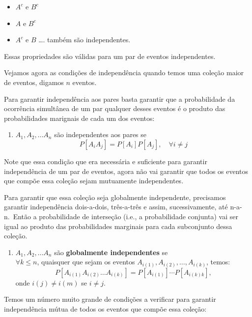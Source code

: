 \documentclass[
]{book}
\providecommand{\tightlist}{%
  \setlength{\itemsep}{0pt}\setlength{\parskip}{0pt}}
\theoremstyle{definition}
\theoremstyle{definition}
\theoremstyle{definition}
\theoremstyle{remark}
\begin{document}
\begin{itemize}
\tightlist
\item
  \({A^c}\) e \({B^c}\)\\
\item
  \({A}\) e \({B^c}\)\\
\item
  \({A^c}\) e \({B}\) \ldots. também são independentes.
\end{itemize}

Essas propriedades são válidas para um par de eventos independentes.

Vejamos agora as condições de independência quando temos uma coleção maior de eventos, digamos \(n\) eventos.

Para garantir independência aos pares basta garantir que a probabilidade da ocorrência simultânea de um par qualquer desses eventos é o produto das probabilidades marignais de cada um dos eventos:

\begin{enumerate}
\def\labelenumi{(\arabic{enumi})}
\setcounter{enumi}{2}
\tightlist
\item
  \({A_1, A_2, \ldots A_n}\) são independentes aos pares se
  \[{P[A_iA_j] = P[A_i]P[A_j], \quad \forall i \neq j}\]
\end{enumerate}

Note que essa condição que era necessária e suficiente para garantir independência de um par de eventos, agora não vai garantir que todos os eventos que compõe essa coleção sejam mutuamente independentes.

Para garantir que essa coleção seja globalmente independente, precisamos garantir independência dois-a-dois, três-a-três e assim, sucessivamente, até n-a-n.~Então a probabilidade de interseção (i.e., a probabilidade conjunta) vai ser igual ao produto das probabilidades marginais para cada subconjunto dessa coleção.

\begin{enumerate}
\def\labelenumi{(\arabic{enumi})}
\setcounter{enumi}{3}
\tightlist
\item
  \({A_1, A_2, \ldots A_n}\) são \textbf{globalmente independentes} se\\
  \({\forall k \leq n}\), quaisquer que sejam os eventos \({A_{i(1)}, A_{i(2)}, \ldots, A_{i(k)}}\), temos:
  \[{P[A_{i(1)} A_{i(2)} \ldots A_{i(k)}] = P[A_{i(1)}] \cdots P[A_{i(k)k}]},\]
  onde \({i(j) \neq i(m)}\) se \({i \neq j}\).
\end{enumerate}

Temos um número muito grande de condições a verificar para garantir independência mútua de todos os eventos que compõe essa coleção:
\end{document}
